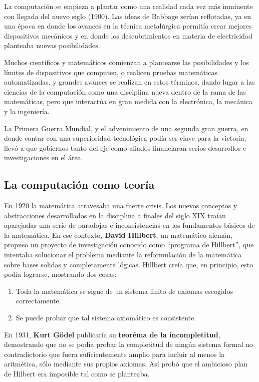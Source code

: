 La computación se empieza a plantar como una realidad cada vez más inminente con
llegada del nuevo siglo (1900). Las ideas de Babbage serían reflotadas, ya en
una época en donde los avances en la técnica metalúrgica permitía crear mejores
dispositivos mecánicos y en donde los descubrimientos en materia de electricidad
planteaba nuevas posibilidades.

Muchos científicos y matemáticos comienzan a plantearse las posibilidades y los
límites de dispositivos que computen, o realicen pruebas matemáticas automatizadas,
y grandes avances se realizan en estos términos, dando lugar a las ciencias de la
computación como una disciplina nueva dentro de la rama de las matemáticas, pero
que interactúa en gran medida con la electrónica, la mecánica y la ingeniería.

La Primera Guerra Mundial, y el advenimiento de una segunda gran guerra, en donde
contar con una superioridad tecnológica podía ser clave para la victoria, llevó
a que gobiernos tanto del eje como aliados financiaran serios desarrollos e
investigaciones en el área.

\subsection{La computación como teoría}

En 1920 la matemática atravesaba una fuerte crisis. Los nuevos conceptos y
abstracciones desarrollados en la disciplina a finales del siglo XIX traían
aparejadas una serie de paradojas e inconsistencias en los fundamentos básicos
de la matemática. En ese contexto, \textbf{David Hillbert}, un matemático
alemán, propuso un proyecto de investigación conocido como ``programa de Hillbert'',
que intentaba solucionar el problema mediante la reformulación de la matemática
sobre bases solidas y completamente lógicas. Hillbert creía que, en principio,
esto podía lograrse, mostrando dos cosas:
\begin{enumerate}
    \item Toda la matemática se sigue de un sistema finito de axiomas escogidos correctamente.
    \item Se puede probar que tal sistema axiomático es consistente.
\end{enumerate}

En 1931, \textbf{Kurt Gödel} publicaría su \textbf{teoréma de la incompletitud},
demostrando que no se podía probar la completitud de ningún sistema formal no
contradictorio que fuera suficientemente amplio para incluir al menos la
aritmética, sólo mediante sus propios axiomas. Así probó que el ambicioso plan
de Hilbert era imposible tal como se planteaba.\autocite[cap. 3]{petzold_2008}

